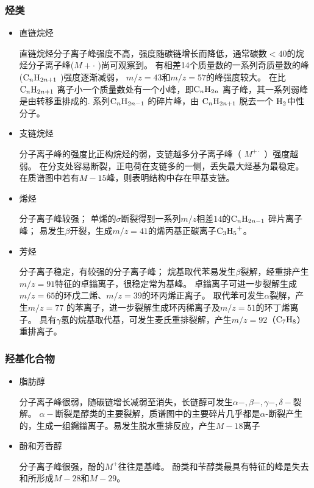 \subsubsection*{烃类}
\begin{itemize}
    \item 直链烷烃
    
    直链烷烃分子离子峰强度不高，强度随碳链增长而降低，通常碳数$<40$的烷烃分子离子峰($M+\cdot$ )尚可观察到。
    有相差14个质量数的一系列奇质量数的峰($\ce{C_{n}H_{2n+1}}$ )强度逐渐减弱， $m/z=43$和$m/z=57$的峰强度较大。
    在比$\ce{C_{n}H_{2n+1}}$ 离子小一个质量数处有一个小峰，即$\ce{C_{n}H_{2n}}$ 离子峰，其一系列弱峰是由转移重排成的.
    系列$\ce{C_{n}H_{2n-1}}$ 的碎片峰，由 $\ce{C_{n}H_{2n+1}}$ 脱去一个
    $\ce{H2}$中性分子。
    \item 支链烷烃
    
    分子离子峰的强度比正构烷烃的弱，支链越多分子离子峰（ $M^{+\cdot}$ ）强度越弱。
    在分支处容易断裂，正电荷在支链多的一侧，丢失最大烃基为最稳定。在质谱图中若有$M-15$峰，则表明结构中存在甲基支链。
    \item 烯烃
    
    分子离子峰较强；
    单烯的$\sigma$断裂得到一系列$m/z$相差$14$的$\ce{C_{n}H_{2n-1}}$ 碎片离子峰；
    易发生$\beta$开裂，生成$m/z =41$的烯丙基正碳离子$\ce{C_{3}H_{5}^{+}}$。
    \item 芳烃
    
    分子离子稳定，有较强的分子离子峰；
    烷基取代苯易发生$\beta$裂解，经重排产生$m/z=91$特征的卓鎓离子，很稳定常为基峰。
    卓鎓离子可进一步裂解生成$m/z=65$的环戊二烯、$m/z=39$的环丙烯正离子。
    取代苯可发生$\alpha$裂解，产生$m/z=77$ 的苯离子，进一步裂解生成环丙稀离子及$m/z=51$的环丁烯离子。
    具有$\gamma$氢的烷基取代基，可发生麦氏重排裂解，产生$m/z=92$（$\ce{C_{7}H_{8}}$）重排离子。
\end{itemize}

\subsubsection*{ 羟基化合物}
\begin{itemize}
    \item 脂肪醇

    分子离子峰很弱，随碳链增长减弱至消失，长链醇可发生$\alpha-,\beta-,\gamma-,\delta-$裂解。
    $\alpha-$断裂是醇类的主要裂解，质谱图中的主要碎片几乎都是$\alpha$-断裂产生的，生成一组鐊鎓离子。易发生脱水重排反应，产生$M-18$离子
    \item 酚和芳香醇
    
    分子离子峰很强，酚的$M^{+}$往往是基峰。
酚类和苄醇类最具有特征的峰是失去和所形成$M-28$和$M-29$。
\end{itemize}

